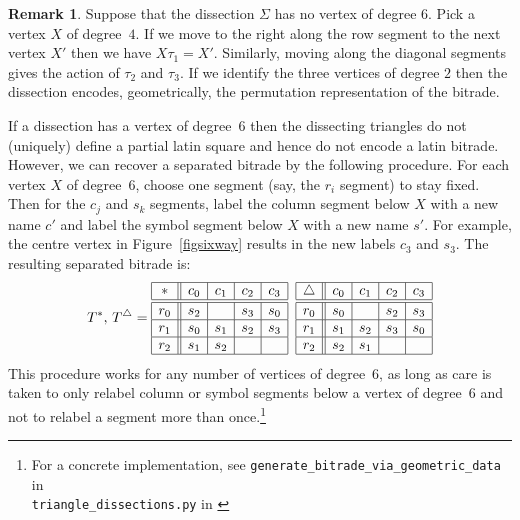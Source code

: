\documentclass[12pt,amstags,fleqn]{article}
\theoremstyle{plain}
\theoremstyle{definition}
\newtheorem{remark}[theorem]{Remark}
\begin{document}
\begin{remark}
Suppose that the dissection $\Sigma$ has no vertex of degree $6$.
Pick a vertex $X$ of degree~$4$. If we
move to the right along the row segment to the next vertex $X'$ then we
have $X \tau_1 = X'$. Similarly, moving along the diagonal segments
gives the action of $\tau_2$ and $\tau_3$. If we identify the three vertices of degree $2$
then the dissection encodes, geometrically,
the permutation representation of the bitrade.

If a dissection has a vertex of degree~$6$ then the dissecting triangles
do not (uniquely) define a partial latin square and hence do not encode
a latin bitrade. However, we can recover a separated
bitrade by the following procedure. For each vertex $X$ of degree~$6$,
choose one segment (say, the $r_i$ segment) to stay fixed. Then for the $c_j$
and $s_k$ segments, label the column segment below $X$ with a new name $c'$
and label the symbol segment below $X$ with a new name $s'$. For example,
the centre vertex in Figure~\ref{figsixway} results in the new labels
$c_3$ and $s_3$. The resulting separated bitrade is:
\[ T^{\ast},\, T^{\triangle} =\begin{array}{|c||c|c|c|c|}
\hline \ast & c_0 & c_1 & c_2 & c_3\\
\hline \hline r_0 & s_2 & ~ & s_3 & s_0\\\hline r_1 & s_0 & s_1 & s_2 & s_3\\\hline r_2 & s_1 & s_2 & ~ & ~\\\hline\end{array}\phantom{x}\begin{array}{|c||c|c|c|c|}
\hline \triangle & c_0 & c_1 & c_2 & c_3\\
\hline \hline r_0 & s_0 & ~ & s_2 & s_3\\\hline r_1 & s_1 & s_2 & s_3 & s_0\\\hline r_2 & s_2 & s_1 & ~ & ~\\\hline\end{array}\]
This procedure works for any number of vertices of degree~$6$, as long
as care is taken to only relabel column or symbol segments below a
vertex of degree~$6$ and not to relabel a segment more than
once.\footnote{For a concrete implementation, see 
\texttt{generate\_bitrade\_via\_geometric\_data} in\\
\texttt{triangle\_dissections.py} in \cite{dissections}}
\end{remark}
\end{document}
